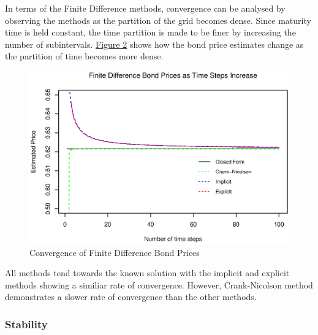 \documentclass[12pt,a4paper]{article}
\begin{document}
In terms of the Finite Difference methods, convergence can be analysed by observing the methods as the partition of the grid becomes dense. Since maturity time is held constant, the time partition is made to be finer by increasing the number of subintervals. \hyperref[fig:Fig Conv]{Figure 2} shows how the bond price estimates change as the partition of time becomes more dense.
\begin{figure}[H]
	\label{fig:Fig Conv}
	\begin{center}
		\includegraphics[trim={0 0.5cm 0 0},clip, width = 14cm]{Fin_Conv.eps}
		\caption{Convergence of Finite Difference Bond Prices}
	\end{center}
\end{figure}

All methods tend towards the known solution with the implicit and explicit methods showing a similiar rate of convergence. However, Crank-Nicolson method demonstrates a slower rate of convergence than the other methods.


\subsubsection{Stability}
\end{document}
